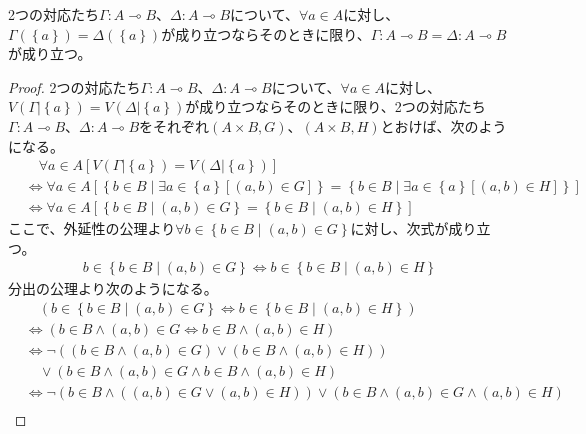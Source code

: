 \documentclass[a4paper]{jsarticle}
\begin{document}
\begin{thm}
\label{1.2.1.17}
2つの対応たち$\varGamma:A \multimap B$、$\varDelta:A \multimap B$について、$\forall a \in A$に対し、$\varGamma\left( \left\{ a \right\} \right) = \varDelta\left( \left\{ a \right\} \right)$が成り立つならそのときに限り、$\varGamma:A \multimap B = \varDelta:A \multimap B$が成り立つ。
\end{thm}
\begin{proof}
2つの対応たち$\varGamma:A \multimap B$、$\varDelta:A \multimap B$について、$\forall a \in A$に対し、$V\left( \varGamma|\left\{ a \right\} \right) = V\left( \varDelta|\left\{ a \right\} \right)$が成り立つならそのときに限り、2つの対応たち$\varGamma:A \multimap B$、$\varDelta:A \multimap B$をそれぞれ$(A \times B,G)$、$(A \times B,H)$とおけば、次のようになる。
\begin{align*}
&\quad \forall a \in A\left[ V\left( \varGamma|\left\{ a \right\} \right) = V\left( \varDelta|\left\{ a \right\} \right) \right]\\
&\Leftrightarrow \forall a \in A\left[ \left\{ b \in B \middle| \exists a \in \left\{ a \right\}\left[ (a,b) \in G \right] \right\} = \left\{ b \in B \middle| \exists a \in \left\{ a \right\}\left[ (a,b) \in H \right] \right\} \right]\\
&\Leftrightarrow \forall a \in A\left[ \left\{ b \in B \middle| (a,b) \in G \right\} = \left\{ b \in B \middle| (a,b) \in H \right\} \right]
\end{align*}
ここで、外延性の公理より$\forall b \in \left\{ b \in B \middle| (a,b) \in G \right\}$に対し、次式が成り立つ。
\begin{align*}
b \in \left\{ b \in B \middle| (a,b) \in G \right\} \Leftrightarrow b \in \left\{ b \in B \middle| (a,b) \in H \right\}
\end{align*}
分出の公理より次のようになる。
\begin{align*}
&\quad \left( b \in \left\{ b \in B \middle| (a,b) \in G \right\} \Leftrightarrow b \in \left\{ b \in B \middle| (a,b) \in H \right\} \right)\\
&\Leftrightarrow \left( b \in B \land (a,b) \in G \Leftrightarrow b \in B \land (a,b) \in H \right)\\
&\Leftrightarrow \neg\left( \left( b \in B \land (a,b) \in G \right) \vee \left( b \in B \land (a,b) \in H \right) \right) \\ 
&\quad \vee \left( b \in B \land (a,b) \in G \land b \in B \land (a,b) \in H \right)\\
&\Leftrightarrow \neg\left( b \in B \land \left( (a,b) \in G \vee (a,b) \in H \right) \right) \vee \left( b \in B \land (a,b) \in G \land (a,b) \in H \right)\\

\end{align*}
\end{proof}
\end{document}
